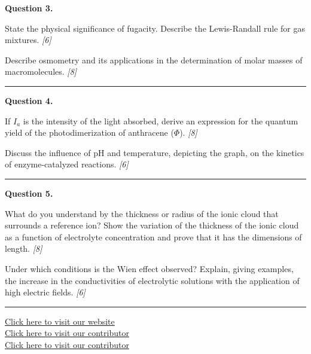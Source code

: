 \documentclass[11pt,a4paper]{article}
\newcommand{\pts}[1]{\hfill   \textit{[#1]}}
\begin{document}
\noindent   \textbf{Question 3.}

\begin{parts}
  \item State the physical significance of fugacity. Describe the Lewis-Randall rule for gas mixtures. \pts{6}
  \item Describe osmometry and its applications in the determination of molar masses of macromolecules. \pts{8}
\end{parts}

\medskip\rule{\linewidth}{0.2pt}




\noindent   \textbf{Question 4.}

\begin{parts}
  \item If $I_a$ is the intensity of the light absorbed, derive an expression for the quantum yield of the photodimerization of anthracene ($\Phi$). \pts{8}
  \item Discuss the influence of pH and temperature, depicting the graph, on the kinetics of enzyme-catalyzed reactions. \pts{6}
\end{parts}

\medskip\rule{\linewidth}{0.2pt}




\noindent   \textbf{Question 5.}

\begin{parts}
  \item What do you understand by the thickness or radius of the ionic cloud that surrounds a reference ion? Show the variation of the thickness of the ionic cloud as a function of electrolyte concentration and prove that it has the dimensions of length. \pts{8}
  \item Under which conditions is the Wien effect observed? Explain, giving examples, the increase in the conductivities of electrolytic solutions with the application of high electric fields. \pts{6}
\end{parts}

\vfill
\rule{\linewidth}{0.4pt}

\begin{center}\small
  \href{https://bhu-exam.vercel.app/}{Click here to visit our website}\\[4pt]
  \href{https://me-aryan.vercel.app/}{Click here to visit our contributor}\\[4pt]
  \href{https://quashan-me.vercel.app/}{Click here to visit our contributor}
\end{center}
\end{document}
